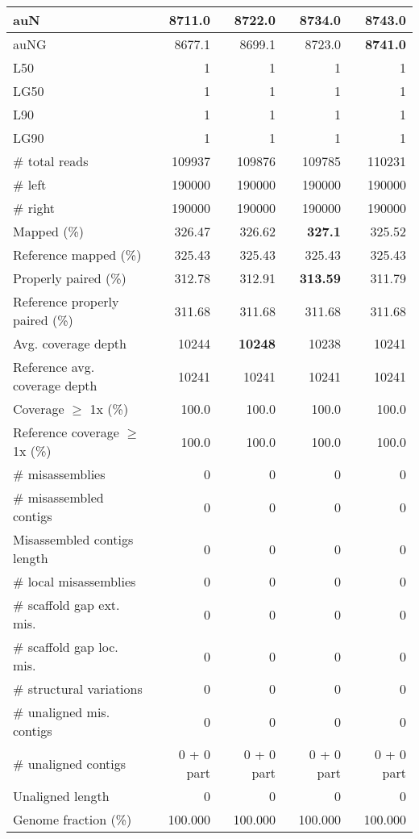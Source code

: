 \documentclass[12pt,a4paper]{article}
\begin{document}
\begin{table}[ht]
\begin{center}
\begin{tabular}{|l*{4}{|r}|}
auN & 8711.0 & 8722.0 & 8734.0 & {\bf 8743.0} \\ \hline
auNG & 8677.1 & 8699.1 & 8723.0 & {\bf 8741.0} \\ \hline
L50 & 1 & 1 & 1 & 1 \\ \hline
LG50 & 1 & 1 & 1 & 1 \\ \hline
L90 & 1 & 1 & 1 & 1 \\ \hline
LG90 & 1 & 1 & 1 & 1 \\ \hline
\# total reads & 109937 & 109876 & 109785 & 110231 \\ \hline
\# left & 190000 & 190000 & 190000 & 190000 \\ \hline
\# right & 190000 & 190000 & 190000 & 190000 \\ \hline
Mapped (\%) & 326.47 & 326.62 & {\bf 327.1} & 325.52 \\ \hline
Reference mapped (\%) & 325.43 & 325.43 & 325.43 & 325.43 \\ \hline
Properly paired (\%) & 312.78 & 312.91 & {\bf 313.59} & 311.79 \\ \hline
Reference properly paired (\%) & 311.68 & 311.68 & 311.68 & 311.68 \\ \hline
Avg. coverage depth & 10244 & {\bf 10248} & 10238 & 10241 \\ \hline
Reference avg. coverage depth & 10241 & 10241 & 10241 & 10241 \\ \hline
Coverage $\geq$ 1x (\%) & 100.0 & 100.0 & 100.0 & 100.0 \\ \hline
Reference coverage $\geq$ 1x (\%) & 100.0 & 100.0 & 100.0 & 100.0 \\ \hline
\# misassemblies & 0 & 0 & 0 & 0 \\ \hline
\# misassembled contigs & 0 & 0 & 0 & 0 \\ \hline
Misassembled contigs length & 0 & 0 & 0 & 0 \\ \hline
\# local misassemblies & 0 & 0 & 0 & 0 \\ \hline
\# scaffold gap ext. mis. & 0 & 0 & 0 & 0 \\ \hline
\# scaffold gap loc. mis. & 0 & 0 & 0 & 0 \\ \hline
\# structural variations & 0 & 0 & 0 & 0 \\ \hline
\# unaligned mis. contigs & 0 & 0 & 0 & 0 \\ \hline
\# unaligned contigs & 0 + 0 part & 0 + 0 part & 0 + 0 part & 0 + 0 part \\ \hline
Unaligned length & 0 & 0 & 0 & 0 \\ \hline
Genome fraction (\%) & 100.000 & 100.000 & 100.000 & 100.000 \\ \hline

\end{tabular}
\end{center}
\end{table}
\end{document}
